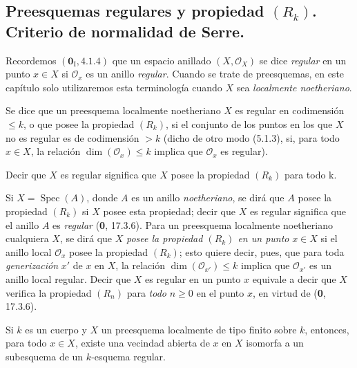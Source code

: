 \subsection{\texorpdfstring{Preesquemas regulares y propiedad $(R_k)$. Criterio de normalidad de Serre.}{Preesquemas regulares y propiedad (R\string_k). Criterio de normalidad de Serre}}

\begin{env}[5.8.1]
\label{IV.2.s5.8.1-fr}
Recordemos $(\mathbf{0}_{\mathrm I},4.1.4)$ que un espacio anillado
$(X,\mathcal O_X)$ se dice \emph{regular} en un punto $x\in X$ si
$\mathcal O_x$ es un anillo \emph{regular}. Cuando se trate de preesquemas, en este
capítulo solo utilizaremos esta terminología cuando $X$ sea \emph{localmente
noetheriano}.
\end{env}

\begin{definition}[5.8.2]
\label{IV.2.s5.8.2-fr}
Se dice que un preesquema localmente noetheriano $X$ es \textup{regular en codimensión
$\leq k$}, o que \textup{posee la propiedad $(R_k)$}, si el conjunto de los puntos en
los que $X$ no es regular es de codimensión $>k$ \textup{(dicho de otro modo (5.1.3),}
si, para todo $x\in X$, la relación $\dim(\mathcal O_x)\leq k$ implica que
$\mathcal O_x$ es regular).
\end{definition}

Decir que $X$ es regular significa que $X$ posee la propiedad $(R_k)$ para
todo $\mathrm{k}$.

Si $X=\operatorname{Spec}(A)$, donde $A$ es un anillo \emph{noetheriano}, se dirá
que $A$ posee la propiedad $(R_k)$ si $X$ posee esta propiedad; decir que $X$
es regular significa que el anillo $A$ es \emph{regular} (\textbf 0, 17.3.6). Para un
preesquema localmente noetheriano cualquiera $X$, se dirá que $X$ \emph{posee la
propiedad $(R_k)$ en un punto} $x\in X$ si el anillo local $\mathcal O_x$
posee la propiedad $(R_k)$; esto quiere decir, pues, que para toda
\emph{generización} $x'$ de $x$ en $X$, la relación
$\dim(\mathcal O_{x'})\leq k$ implica que $\mathcal O_{x'}$ es un anillo local
regular. Decir que $X$ es regular en un punto $x$ equivale a decir que $X$
verifica la propiedad $(R_n)$ para \emph{todo} $n\geq0$ en el punto $x$, en virtud
de (\textbf 0, 17.3.6).

\begin{proposition}[5.8.3]
\label{IV.2.s5.8.3-fr}
Si $k$ es un cuerpo y $X$ un preesquema localmente de tipo finito sobre $k$,
entonces, para todo $x\in X$, existe una vecindad abierta de $x$ en $X$
isomorfa a un subesquema de un $k$-esquema regular.
\end{proposition}

